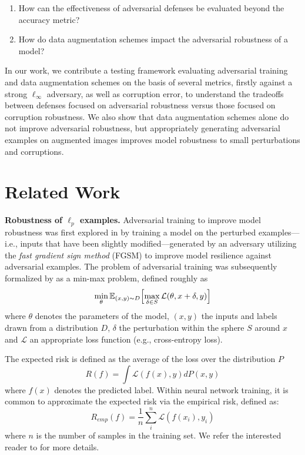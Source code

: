 \documentclass[a4paper]{article}
\begin{document}
\begin{enumerate}
    \setlength{\itemindent}{1cm}
    \renewcommand{\labelenumi}{\textbf{RQ\arabic{enumi}.}}
    \item How can the effectiveness of adversarial defenses be evaluated beyond
    the accuracy metric?
    \item How do data augmentation schemes impact the adversarial robustness of
    a model?
\end{enumerate}

In our work, we contribute a testing framework evaluating adversarial
training and data augmentation schemes on the basis of several metrics, firstly
against a strong $\ell_\infty$ adversary, as well as corruption error, to understand
the tradeoffs between defenses focused on adversarial robustness versus those
focused on corruption robustness. We also show that data augmentation schemes alone
do not improve adversarial robustness, but appropriately generating adversarial
examples on augmented images improves model robustness to small perturbations
and corruptions.

\section{Related Work}

\textbf{Robustness of $\ell_p$ examples.}
Adversarial training to improve model robustness was first explored in
\textcite{goodfellow2015explaining}
by training a model on the perturbed examples—i.e., inputs that have been
slightly modified—generated by an adversary utilizing the \textit{fast gradient
sign method} (FGSM) to improve model resilience against adversarial examples.
The problem of adversarial training was subsequently formalized by
\textcite{huang2016learningstrongadversary}
as a min-max problem, defined roughly as
\begin{equation}
\min_\theta\mathbb E_{(x,y)\sim D}\Bigl[\max_{\delta\in S}\mathcal L
(\theta, x+\delta, y)\Bigr]
\end{equation}
where $\theta$ denotes the parameters of the model, $(x, y)$ the inputs and
labels drawn from a distribution $D$, $\delta$ the perturbation within the
sphere $S$ around $x$ and $\mathcal L$ an appropriate loss function (e.g.,
cross-entropy loss).

\noindent The expected risk is defined as the average of the loss over the
distribution $P$
\begin{equation}
R(f) = \int\mathcal L(f(x), y)dP(x, y)
\end{equation}
where $f(x)$ denotes the predicted label. Within neural network training, it
is common to approximate the expected risk via the empirical risk, defined as:
\begin{equation}
R_{emp}(f) = \frac 1 n \sum_i^n \mathcal L(f(x_i), y_i)
\end{equation}
where $n$ is the number of samples in the training set. We refer the interested
reader to \textcite{chapelle2000vicinal} for more details.
\end{document}
